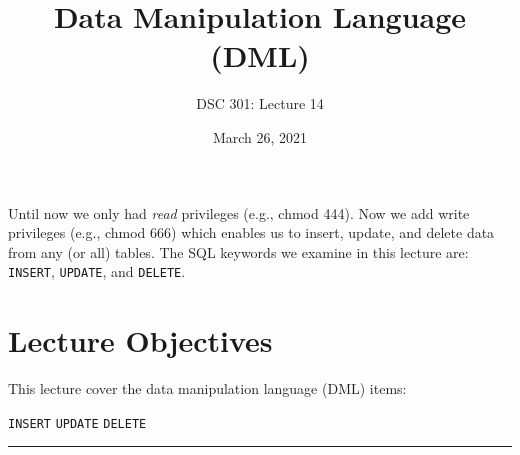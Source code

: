 \documentclass{article}
\newtheorem{definition}{Definition}
\begin{document}
\title{Data Manipulation Language (DML)}
\author{DSC 301: Lecture 14}
\date{March 26, 2021} %
\maketitle






        


\noindent Until now we only had \textit{read} privileges (e.g., chmod 444).  Now we add write privileges (e.g., chmod 666) which enables us to insert, update, and delete data from any (or all) tables.  The SQL keywords we examine in this lecture are:  \texttt{INSERT}, \texttt{UPDATE}, and \texttt{DELETE}.  

\section*{Lecture Objectives}
This lecture cover the data manipulation language (DML) items:
\begin{outline}
        \1   \texttt{INSERT}
        \1   \texttt{UPDATE}  
        \1   \texttt{DELETE}     

\end{outline}



 

\hspace{-0.5cm}\rule[-0.101in]{\textwidth}{0.0025in}
% 
% 
\end{document}

